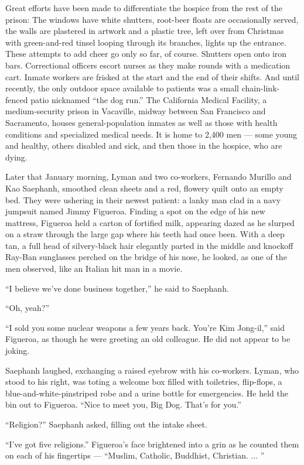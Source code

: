 Great efforts have been made to differentiate the hospice from the rest
of the prison: The windows have white shutters, root-beer floats are
occasionally served, the walls are plastered in artwork and a plastic
tree, left over from Christmas with green-and-red tinsel looping through
its branches, lights up the entrance. These attempts to add cheer go
only so far, of course. Shutters open onto iron bars. Correctional
officers escort nurses as they make rounds with a medication cart.
Inmate workers are frisked at the start and the end of their shifts. And
until recently, the only outdoor space available to patients was a small
chain-link-fenced patio nicknamed ``the dog run.'' The California
Medical Facility, a medium-security prison in Vacaville, midway between
San Francisco and Sacramento, houses general-population inmates as well
as those with health conditions and specialized medical needs. It is
home to 2,400 men --- some young and healthy, others disabled and sick,
and then those in the hospice, who are dying.

Later that January morning, Lyman and two co-workers, Fernando Murillo
and Kao Saephanh, smoothed clean sheets and a red, flowery quilt onto an
empty bed. They were ushering in their newest patient: a lanky man clad
in a navy jumpsuit named Jimmy Figueroa. Finding a spot on the edge of
his new mattress, Figueroa held a carton of fortified milk, appearing
dazed as he slurped on a straw through the large gap where his teeth had
once been. With a deep tan, a full head of silvery-black hair elegantly
parted in the middle and knockoff Ray-Ban sunglasses perched on the
bridge of his nose, he looked, as one of the men observed, like an
Italian hit man in a movie.

``I believe we've done business together,'' he said to Saephanh.

``Oh, yeah?''

``I sold you some nuclear weapons a few years back. You're Kim
Jong-il,'' said Figueroa, as though he were greeting an old colleague.
He did not appear to be joking.

Saephanh laughed, exchanging a raised eyebrow with his co-workers.
Lyman, who stood to his right, was toting a welcome box filled with
toiletries, flip-flops, a blue-and-white-pinstriped robe and a urine
bottle for emergencies. He held the bin out to Figueroa. ``Nice to meet
you, Big Dog. That's for you.''

``Religion?'' Saephanh asked, filling out the intake sheet.

``I've got five religions.'' Figueroa's face brightened into a grin as
he counted them on each of his fingertips --- ``Muslim, Catholic,
Buddhist, Christian. ... ''

